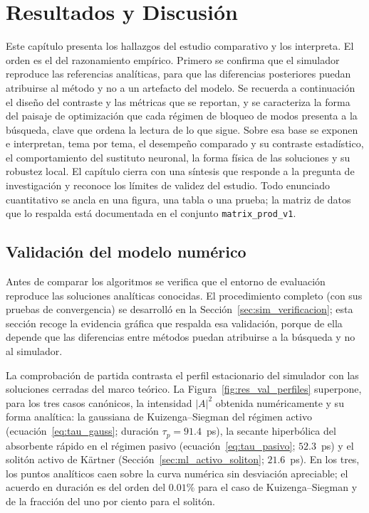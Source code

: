 
\chapter{Resultados y Discusión}
\label{ch:Results}

Este capítulo presenta los hallazgos del estudio comparativo y los interpreta. El orden
es el del razonamiento empírico. Primero se confirma que el simulador reproduce las
referencias analíticas, para que las diferencias posteriores puedan atribuirse al método
y no a un artefacto del modelo. Se recuerda a continuación el diseño del contraste y las
métricas que se reportan, y se caracteriza la forma del paisaje de optimización que cada
régimen de bloqueo de modos presenta a la búsqueda, clave que ordena la lectura de lo que
sigue. Sobre esa base se exponen e interpretan, tema por tema, el desempeño comparado y
su contraste estadístico, el comportamiento del sustituto neuronal, la forma física de
las soluciones y su robustez local. El capítulo cierra con una síntesis que responde a la
pregunta de investigación y reconoce los límites de validez del estudio. Todo enunciado
cuantitativo se ancla en una figura, una tabla o una prueba; la matriz de datos que lo
respalda está documentada en el conjunto \texttt{matrix\_prod\_v1}.

\section{Validación del modelo numérico}
\label{sec:res_validacion}

Antes de comparar los algoritmos se verifica que el entorno de evaluación reproduce
las soluciones analíticas conocidas. El procedimiento completo (con sus pruebas de
convergencia) se desarrolló en la Sección~\ref{sec:sim_verificacion}; esta sección
recoge la evidencia gráfica que respalda esa validación, porque de ella depende que
las diferencias entre métodos puedan atribuirse a la búsqueda y no al simulador.

La comprobación de partida contrasta el perfil estacionario del simulador con las
soluciones cerradas del marco teórico. La Figura~\ref{fig:res_val_perfiles} superpone,
para los tres casos canónicos, la intensidad $|A|^2$ obtenida numéricamente y su forma
analítica: la gaussiana de Kuizenga--Siegman del régimen activo (ecuación~\eqref{eq:tau_gauss}; duración $\tau_p=91.4$~ps), la secante hiperbólica del absorbente rápido en el régimen pasivo (ecuación~\eqref{eq:tau_pasivo}; $52.3$~ps) y el solitón activo de Kärtner (Sección~\ref{sec:ml_activo_soliton}; $21.6$~ps). En los tres, los puntos
analíticos caen sobre la curva numérica sin desviación apreciable; el acuerdo en
duración es del orden del $0.01\%$ para el caso de Kuizenga--Siegman y de la fracción
del uno por ciento para el solitón.

